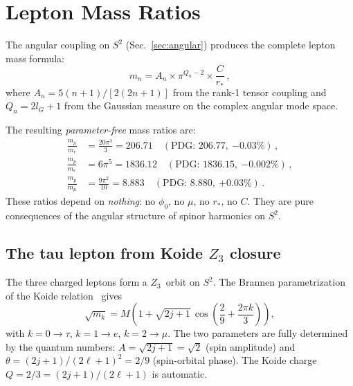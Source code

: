 \documentclass[aps,prd,twocolumn,superscriptaddress,nofootinbib,longbibliography]{revtex4-2}
\newcommand{\rstar}{r_{*}}
\newcommand{\phiz}{\phi_0}
\begin{document}
\section{Lepton Mass Ratios}\label{sec:leptons}

The angular coupling on $S^2$ (Sec.~\ref{sec:angular}) produces the
complete lepton mass formula:
\begin{equation}\label{eq:lepton}
  m_n = A_n \times \pi^{Q_n - 2} \times \frac{C}{\rstar}\,,
\end{equation}
where $A_n = 5(n+1)/[2(2n+1)]$ from the rank-1 tensor coupling and
$Q_n = 2l_G + 1$ from the Gaussian measure on the complex angular
mode space.

The resulting \emph{parameter-free} mass ratios are:
\begin{align}
  \frac{m_\mu}{m_e} &= \frac{20\pi^3}{3} = 206.71
    \quad(\text{PDG: }206.77,\ {-0.03\%})\,, \label{eq:mu-e}\\
  \frac{m_p}{m_e} &= 6\pi^5 = 1836.12
    \quad(\text{PDG: }1836.15,\ {-0.002\%})\,, \label{eq:p-e}\\
  \frac{m_p}{m_\mu} &= \frac{9\pi^2}{10} = 8.883
    \quad(\text{PDG: }8.880,\ {+0.03\%})\,. \label{eq:p-mu}
\end{align}
These ratios depend on \emph{nothing}: no $\phiz$, no $\mu$, no
$\rstar$, no $C$.  They are pure consequences of the angular structure
of spinor harmonics on $S^2$.

\subsection{The tau lepton from Koide $Z_3$ closure}

The three charged leptons form a $Z_3$~orbit on $S^2$.  The Brannen
parametrization~\cite{Brannen2006} of the Koide relation~\cite{Koide1983} gives
\begin{equation}\label{eq:koide}
  \sqrt{m_k} = M\!\left(1 + \sqrt{2j+1}\,
    \cos\!\left(\frac{2}{9} + \frac{2\pi k}{3}\right)\right),
\end{equation}
with $k = 0 \to \tau$, $k = 1 \to e$, $k = 2 \to \mu$.  The two
parameters are fully determined by the quantum numbers:
$A = \sqrt{2j+1} = \sqrt{2}$ (spin amplitude) and
$\theta = (2j+1)/(2\ell+1)^2 = 2/9$ (spin-orbital phase).  The Koide
charge $Q = 2/3 = (2j+1)/(2\ell+1)$ is automatic.
\end{document}
